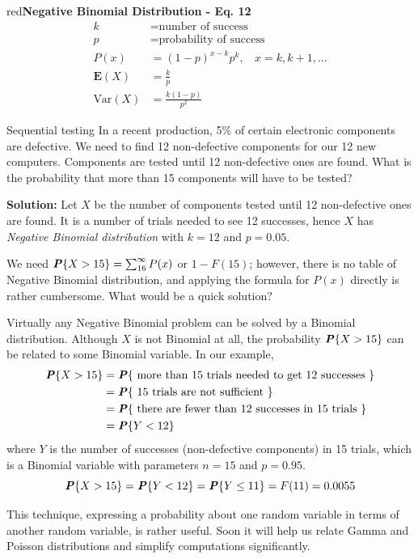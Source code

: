 \documentclass{article}
\newenvironment{example_break}[1]{\begin{mybox}[breakable]{green}{\textbf{Example #1}}}{\end{mybox}}
\newenvironment{formula}[1]{\begin{mybox}{red}{\textbf{#1}}}{\end{mybox}}
\newcommand{\prob}[1]{\textbf{\textit{P}}\{#1\}}
\begin{document}
\begin{formula}{Negative Binomial Distribution - Eq. 12}
\begin{align*}
    k &= \text{number of success}\\
    p &= \text{probability of success}\\
    P(x) &= (1-p)^{x-k} p^k,\ \ \ \ x = k, k+1, ...\\
    \mathbf{E}(X) &= \frac{k}{p}\\
    \text{Var}(X) &= \frac{k (1-p)}{p^2}
\end{align*}
\end{formula}

\begin{example_break}{Sequential testing}
In a recent production, 5\% of certain electronic components are defective. We need to find 12 non-defective components for our 12 new
computers. Components are tested until 12 non-defective ones are found. What is the probability that more than 15 components will have to be tested?

\textbf{Solution:}
Let $X$ be the number of components tested until 12 non-defective ones are found. It is a number of trials needed to see 12 successes, hence $X$ has \textit{Negative Binomial distribution} with $k = 12$ and $p = 0.05$.

We need $\prob{X > 15} = \sum_{16}^{\infty} P(x)$ or $1 - F(15)$; however, there is no table of Negative Binomial distribution, and applying the formula for $P(x)$ directly is rather cumbersome. What would be a quick solution?

\newpage
Virtually any Negative Binomial problem can be solved by a Binomial distribution. Although $X$ is not Binomial at all, the probability $\prob{X > 15}$ can be related to some Binomial variable. In our example,
\begin{align*}
    \prob{X > 15} &= \prob{\text{ more than 15 trials needed to get 12 successes }}\\
    &= \prob{\text{ 15 trials are not sufficient }}\\
    &= \prob{\text{ there are fewer than 12 successes in 15 trials }}\\
    &= \prob{Y < 12}
\end{align*}
where $Y$ is the number of successes (non-defective components) in 15 trials, which is a Binomial variable with parameters $n = 15$ and $p = 0.95$. 
\begin{equation*}
    \prob{X > 15} = \prob{Y < 12} = \prob{Y \leq 11} = F(11) = 0.0055
\end{equation*}

This technique, expressing a probability about one random variable in terms of another random variable, is rather useful. Soon it will help us relate Gamma and Poisson distributions and simplify computations significantly. 
\end{example_break}
\end{document}
